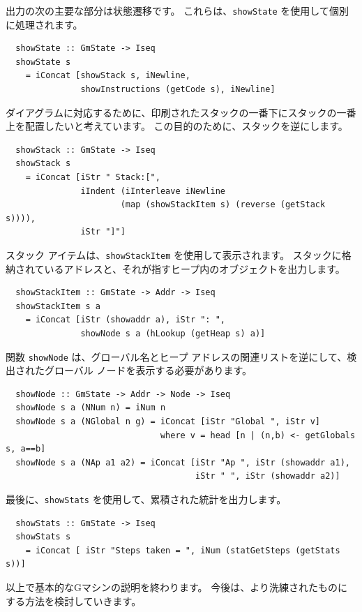 \documentclass{jbook}
\begin{document}
出力の次の主要な部分は状態遷移です。 これらは、\texttt{showState} を使用して個別に処理されます。

\begin{verbatim}
  showState :: GmState -> Iseq
  showState s
    = iConcat [showStack s, iNewline,
               showInstructions (getCode s), iNewline]
\end{verbatim}

ダイアグラムに対応するために、印刷されたスタックの一番下にスタックの一番上を配置したいと考えています。
この目的のために、スタックを逆にします。

\begin{verbatim}
  showStack :: GmState -> Iseq
  showStack s
    = iConcat [iStr " Stack:[",
               iIndent (iInterleave iNewline
                       (map (showStackItem s) (reverse (getStack s)))),
               iStr "]"]
\end{verbatim}

スタック アイテムは、\texttt{showStackItem} を使用して表示されます。
スタックに格納されているアドレスと、それが指すヒープ内のオブジェクトを出力します。

\begin{verbatim}
  showStackItem :: GmState -> Addr -> Iseq
  showStackItem s a
    = iConcat [iStr (showaddr a), iStr ": ",
               showNode s a (hLookup (getHeap s) a)]
\end{verbatim}

関数 \texttt{showNode} は、グローバル名とヒープ アドレスの関連リストを逆にして、検出されたグローバル ノードを表示する必要があります。

\begin{verbatim}
  showNode :: GmState -> Addr -> Node -> Iseq
  showNode s a (NNum n) = iNum n
  showNode s a (NGlobal n g) = iConcat [iStr "Global ", iStr v]
                               where v = head [n | (n,b) <- getGlobals s, a==b]
  showNode s a (NAp a1 a2) = iConcat [iStr "Ap ", iStr (showaddr a1),
                                      iStr " ", iStr (showaddr a2)]
\end{verbatim}

最後に、\texttt{showStats} を使用して、累積された統計を出力します。

\begin{verbatim}
  showStats :: GmState -> Iseq
  showStats s
    = iConcat [ iStr "Steps taken = ", iNum (statGetSteps (getStats s))]
\end{verbatim}

以上で基本的なGマシンの説明を終わります。
今後は、より洗練されたものにする方法を検討していきます。
\end{document}
